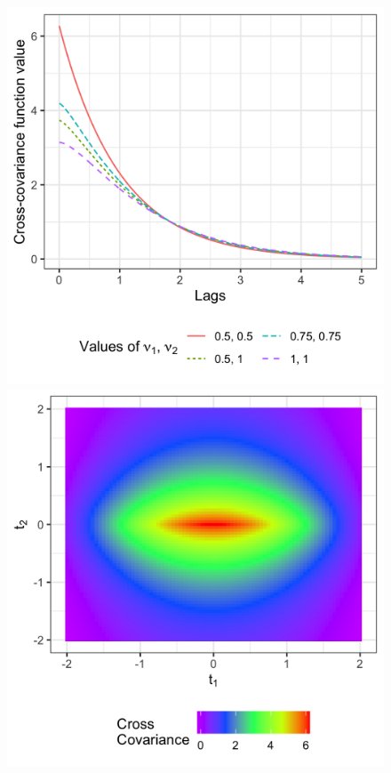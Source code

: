 \documentclass[11pt]{article}
\begin{document}

\begin{figure}
\centering
\includegraphics[scale = .15]{../symmetric_spat.png}
\includegraphics[scale = .15]{../asymmetric_spat_e.png}

\end{figure}
\end{document}
